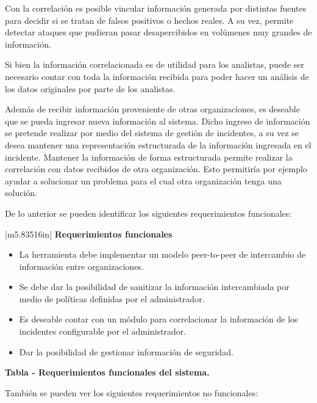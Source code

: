 \documentclass[11pt]{article}
\makeatletter
\newcommand\arraybslash{\let\\\@arraycr}
\newcounter{Tabla}
\renewcommand\theTabla{\arabic{Tabla}}
\makeatother
\begin{document}
{
Con la correlación es posible vincular información generada por distintas fuentes para decidir si se tratan de falsos
positivos o hechos reales. A su vez, permite detectar ataques que pudieran pasar desapercibidos en volúmenes muy
grandes de información.}

{
Si bien la información correlacionada es de utilidad para los analistas, puede ser necesario contar con toda la
información recibida para poder hacer un análisis de los datos originales por parte de los analistas.}


\bigskip

{
Además de recibir información proveniente de otras organizaciones, es deseable que se pueda ingresar nueva información
al sistema. Dicho ingreso de información se pretende realizar por medio del sistema de gestión de incidentes, a su vez
se desea mantener una representación estructurada de la información ingresada en el incidente. Mantener la información
de forma estructurada permite realizar la correlación con datos recibidos de otra organización. Esto permitiría por
ejemplo ayudar a solucionar un problema para el cual otra organización tenga una solución.}


\bigskip
\newpage
{
De lo anterior se pueden identificar los siguientes requerimientos funcionales:}
\begin{flushleft}
\tablefirsthead{}
\tablehead{}
\tabletail{}
\tablelasttail{}
\begin{supertabular}{|m{5.83516in}|}
\hline
\centering\arraybslash{\bfseries Requerimientos funcionales}\\\hline
\begin{itemize}
\item { La herramienta debe implementar un modelo peer-to-peer de intercambio de
información entre organizaciones.}
\item { Se debe dar la posibilidad de sanitizar la información intercambiada por medio
de políticas definidas por el administrador.}
\item { Es deseable contar con un módulo para correlacionar la información de los
incidentes configurable por el administrador.}
\item { Dar la posibilidad de gestionar información de seguridad.}
\end{itemize}
\\\hline
\end{supertabular}
\end{flushleft}
{\centering{}\bfseries
\foreignlanguage{spanish}{Tabla }\stepcounter{Tabla}{\theTabla}\foreignlanguage{spanish}{ - Requerimientos funcionales
del sistema.}
\par}
\bigskip
{
También se pueden ver los siguientes requerimientos no funcionales:}
\end{document}
